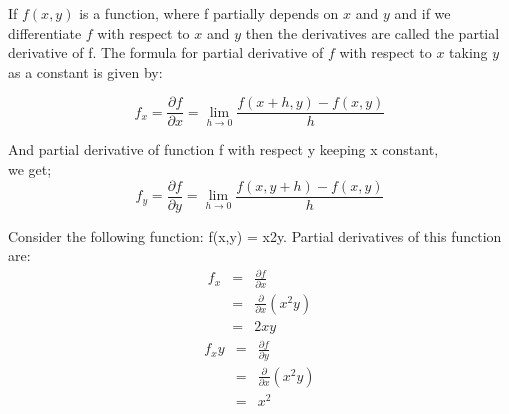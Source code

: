 \documentclass[a4paper]{article}
\begin{document}
If $f(x, y)$ is a function, where f partially depends on $x$ and $y$ and if we diﬀerentiate $f$ with respect to $x$ and $y$ then the derivatives are called the partial derivative of f. The formula for partial derivative of $f$ with respect to $x$ taking $y$ as a constant is given by:

\begin{equation*} %
    f_x = \frac{\partial{f}}{\partial{x}} = \lim_{h\to 0}\frac{f(x+h,y) - f(x,y)}{h}
\end{equation*}

And partial derivative of function f with respect y keeping x constant,\\we get;
\begin{equation*} %
    f_y = \frac{\partial{f}}{\partial{y}} = \lim_{h\to 0}\frac{f(x,y+h) - f(x,y)}{h}
\end{equation*}

Consider the following function: f(x,y) = x2y. Partial derivatives of this function are:
\begin{eqnarray*}
f_x &=& \frac{\partial{f}}{\partial{x}}\\
    &=& \frac{\partial}{\partial{x}}(x^2y)\\
    &=& 2xy
\end{eqnarray*}
\begin{eqnarray*}
    f_xy &=& \frac{\partial{f}}{\partial{y}}\\
        &=& \frac{\partial}{\partial{x}}(x^2y)\\
        &=& x^2
\end{eqnarray*}
\end{document}
